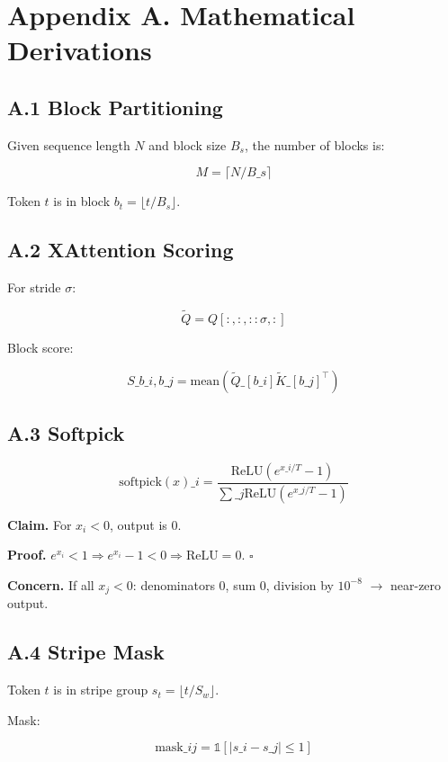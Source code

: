 \section{Appendix A. Mathematical Derivations}

\subsection{A.1 Block Partitioning}

Given sequence length $N$ and block size $B_s$, the number of blocks is:

\[
M = \lceil N / B\_s \rceil
\tag{A.1}
\]

Token $t$ is in block $b_t = \lfloor t / B_s \rfloor$.

\subsection{A.2 XAttention Scoring}

For stride $\sigma$:

\[
\tilde{Q} = Q[:, :, ::\sigma, :]
\tag{A.2}
\]

Block score:

\[
S\_{b\_i, b\_j} = \text{mean}(\tilde{Q}\_{[b\_i]} \tilde{K}\_{[b\_j]}^\top)
\tag{A.3}
\]

\subsection{A.3 Softpick}

\[
\text{softpick}(x)\_i = \frac{\text{ReLU}(e^{x\_i/T} - 1)}{\sum\_j \text{ReLU}(e^{x\_j/T} - 1)}
\tag{A.4}
\]

\textbf{Claim.} For $x_i < 0$, output is 0.

\textbf{Proof.} $e^{x_i} < 1 \Rightarrow e^{x_i} - 1 < 0 \Rightarrow \text{ReLU} = 0$. $\square$

\textbf{Concern.} If all $x_j < 0$: denominators 0, sum 0, division by $10^{-8}$ $\to$ 
near-zero output.

\subsection{A.4 Stripe Mask}

Token $t$ is in stripe group $s_t = \lfloor t / S_w \rfloor$.

Mask:

\[
\text{mask}\_{ij} = \mathbb{1}[|s\_i - s\_j| \leq 1]
\tag{A.5}
\]

